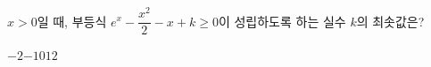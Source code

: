 $x>0$일 때, 부등식 $e^x-\dfrac{x^2}{2}-x+k\ge 0$이 성립하도록 하는 실수 $k$의 최솟값은?
\begin{choices32}{$-2$}{$-1$}{$0$}{$1$}{$2$}\end{choices32}
